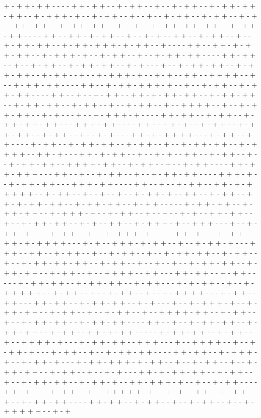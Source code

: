+ - + + - + + - - - - + + - + + - - + - + + - - + - - + - + + - - + - + + - + + - + + - - + - + + + - + - - + - + + - - + - - + - - + - + + - - + - + + - - + - + - - + + - + + - - + - + + - + + - - + - - + - - + - + + - + + - + + - - + - + + - + + - - - - + + - - + + - + - + + - - + - - + - + - - + + - - + - + + - - + - - + - + + - + + - - + - + + - + + + - + - + + - - + - - - - + + - - + + - + - + + - + + - - + - + + + - + - - + - + + - - + - - + - + + - + + - - - - + + - + + - - + - - + - + + - - + - + + - + + - - + - + - - - + - - + - + + - + + - - + - + + - + + - - + - + + - - + - - + - + + + - + - - + - + - - + + - - + + + + - - + - - + - + + - + + - - - - + + - - + - + + - + + + - + - - + - - + - + + - - + - + + - + + - - - - + + - - + - - + - + + - - + + - + - + + - + + - - + - + + - + + - - + - + + - + + - - + - + + - - + - - + - + + - - + - - + + + + - - + - - + - + + - + + - - + - + - - - + - - + - + + + - + - - - - + + - + + - - + - + + - - + - + + - + + - + + - - - + + + - + + - - - - + + - - + + - + - - + - + + - - + - + + - + + - - + - + + - - + - - + - + - - - + + - + - + + + + - - - + - + + - - + + - - - - + - + + - - + - + + - + + - - + - + + - - + - - + - + + - + + - - + - + + + + - - + + - + - - - + + - + - + + - - + - - + - + - - + + - - + - + + - - + - - + - + + - + + - - + + + + - + + - - + - + + - - + - - + - + + - - - - + + - + + - + + + - - - + + - - + - - + - + + - - + - - + - + + - + + - - - - + + + - + - - + - + + - + + - - - + + + - + + - - - - + + - - + - - + - + + - - + + - + - + + + + + - - + - + + - - + - - + - - + - - + - + + - + - - + + - - + - + + - - + + - + - + + - + + - - + - + + - + + - - + - + + - - - - - + - + + - + + - - + - + + - + + - - + - + + + - + - - + - + + - - + - - + - - + - + - - + + - + + - - + - - + - + + - + + - - + - + - - + + - - + - + + + - + - - + + + - - - + - - + - + + - + + - - + - + + - - + - - + - + + + - + - - + - + + - + - - - + - + + - - + + - + - + + + + - - - + - + - - + + + - + - + + - - + - - + - + + - + - - - + + + - - + + - - + - + + - - + - - + - + + - - + - - + - + + - + + - - + - + + - - + - - + - + + - + + - + + - - + - + + - - + - - + - - + - - + - + + - + + - - + - + + - + + - - + - + + - - + - - + + + + - - + + - - - + + - + + - - + - + + - - - - - + - + + - + + - - + - + + - + + - - + - + + - - - + - + - + + - - + - - + - + + + + + - - + - + + - - + - - + - + + - - + - - + - + + + + - - - + - + + - - + + - - - + + - + + - - + - + + - + + - - + - + - - - + - - + - + + + - + - - + - + + - + + - - + - + + - - + - - + - + + - - + - - + + + + - + + - - + - + + - - + - - + - + + - + + - - + - + + - + + - - - - + + - - + - - + - + + - + + - - + - + + - + + - - + - + + - - + + - + - + + - - - - - + - + + - + + - - + - + + - - + - - + + + + - + - - - + - + + - + + - - + + + - - - + - - + + + + - - + - - + - + + - + - - - + - + + - - + - - + - + + - + + - - - - + + - + + - - + - + + + - + - - + - + + - + - - - + - + + - + + + - + - + + - - + - - + - + + - - + - - + - + + - + + - - + - + + - - + - - + - + - - - + + - + - + + - + + - - + - + + - - + - - + - + + - + + - - + - + + - + - - + + - + + + - + - - + - - + - + + - - - - + + - + + - - + - + + - - + - - + + + + + - + - - + - + - - + + - - + - + + - - + - - + - + + - + + - - - - + + - + + - - + - + + - - + - - + - + + - - + - - + - + + + + + - - + - + 